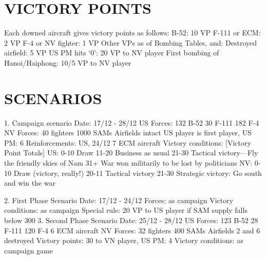 \section*{VICTORY POINTS}
Each downed aircraft gives victory
points as follows:
B-52: 10 VP
F-111 or ECM: 2 VP
F-4 or NV fighter: 1 VP
Other VPs as of Bombing Tables,
and:
Destroyed airfield: 5 VP
US PM hits ‘0’: 20 VP to NV player
First bombing of Hanoi/Haiphong:
10/5 VP to NV player

\section*{SCENARIOS}
1. Campaign scenario
Date: 17/12 - 28/12
US Forces:
132 B-52
30 F-111
182 F-4
NV Forces:
40 fighters
1000 SAMs
Airfields intact
US player is first player, US PM: 6
Reinforcements: US, 24/12 7 ECM
aircraft
Victory conditions:
[Victory Point Totals]
US:
0-10 Draw
11-20 Business as usual
21-30 Tactical victory—Fly the
friendly skies of Nam
31+ War won militarily to be lost
by politicians
NV:
0-10 Draw (victory, really!)
20-11 Tactical victory
21-30 Strategic victory: Go south and
win the war

2. First Phase Scenario
Date: 17/12 - 24/12
Forces: as campaign
Victory conditions: as campaign
Special rule: 20 VP to US player if
SAM supply falls below 300
3. Second Phase Scenario
Date: 25/12 - 28/12
US Forces:
123 B-52
28 F-111
120 F-4
6 ECM aircraft
NV Forces:
32 fighters
400 SAMs
Airfields 2 and 6 destroyed
Victory points: 30 to VN player,
US PM: 4
Victory conditions: as campaign game


